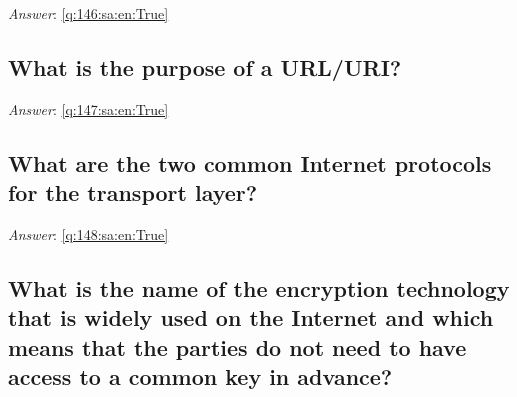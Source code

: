 \documentclass[a4paper,11pt,oneside]{article}
\begin{document}
\begin{sloppypar}
\label{q:146:sa:en:False}

\vspace{2cm}

\noindent\makebox[\textwidth]{\hrulefill}

\vspace{1cm}

\textit{Answer}: \autoref{q:146:sa:en:True}



\subsection{What is the purpose of a URL/URI?}

\label{q:147:sa:en:False}

\vspace{2cm}

\noindent\makebox[\textwidth]{\hrulefill}

\vspace{1cm}

\textit{Answer}: \autoref{q:147:sa:en:True}



\subsection{What are the two common Internet protocols for the transport layer?}

\label{q:148:sa:en:False}

\vspace{2cm}

\noindent\makebox[\textwidth]{\hrulefill}

\vspace{1cm}

\textit{Answer}: \autoref{q:148:sa:en:True}



\subsection{What is the name of the encryption technology that is widely used on the Internet and which means that the parties do not need to have access to a common key in advance?}

\label{q:149:sa:en:False}

\vspace{2cm}

\noindent\makebox[\textwidth]{\hrulefill}

\vspace{1cm}


\end{sloppypar}
\end{document}
